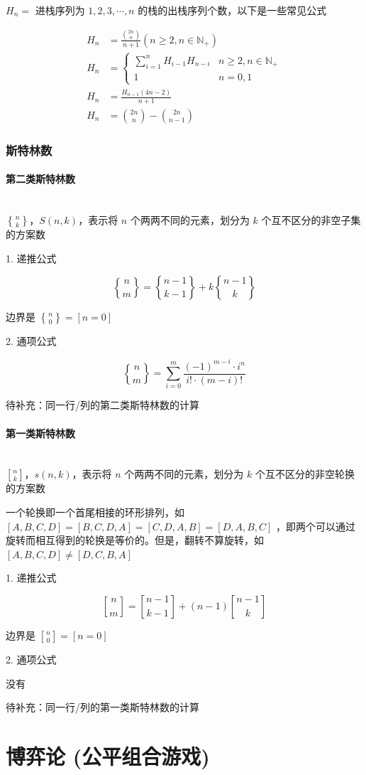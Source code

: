 \documentclass[12pt]{article}
\theoremstyle{definition}
\theoremstyle{remark}
\newcommand{\subsubsubsection}[1]{\paragraph{#1}\mbox{}\\}
\begin{document}
$H_n=$ 进栈序列为 $1,2,3,\cdots,n$ 的栈的出栈序列个数，以下是一些常见公式

$$
\begin{aligned}
	H_{n}&=\frac{\binom{2n}{n}}{n+1}(n\ge2,n\in\mathbb{N}_{+})\\
	H_{n}&=
	\begin{cases}
		\sum_{i=1}^{n}H_{i-1}H_{n-i} & n\ge2,n\in\mathbb{N}_{+}\\
		1 & n=0,1
	\end{cases}\\
	H_{n}&=\frac{H_{n-1}(4n-2)}{n+1}\\
	H_{n}&=\binom{2n}{n}-\binom{2n}{n-1}
\end{aligned}
$$

\newpage

\subsubsection{斯特林数}

\subsubsubsection{第二类斯特林数}

$n\brace k$，$S(n,k)$，表示将 $n$ 个两两不同的元素，划分为 $k$ 个互不区分的非空子集的方案数

1. 递推公式

$$
{n\brace m}={n-1\brace k-1}+k{n-1\brace k}
$$

边界是 ${n\brace 0}=[n=0]$

2. 通项公式

$$
{n\brace m}=\sum_{i=0}^{m}\frac{(-1)^{m-i}\cdot i^n}{i!\cdot(m-i)!}
$$

待补充：同一行/列的第二类斯特林数的计算

\subsubsubsection{第一类斯特林数}

$n\brack k$，$s(n,k)$，表示将 $n$ 个两两不同的元素，划分为 $k$ 个互不区分的非空轮换的方案数

一个轮换即一个首尾相接的环形排列，如 $[A,B,C,D]=[B,C,D,A]=[C,D,A,B]=[D,A,B,C]$ ，即两个可以通过旋转而相互得到的轮换是等价的。但是，翻转不算旋转，如 $[A,B,C,D]\ne[D,C,B,A]$

1. 递推公式

$$
{n\brack m}={n-1\brack k-1}+(n-1){n-1\brack k}
$$

边界是 ${n\brack 0}=[n=0]$

2. 通项公式

\centerline{没有}

待补充：同一行/列的第一类斯特林数的计算

\newpage

{\centering\section{博弈论 (公平组合游戏)}}
\end{document}
